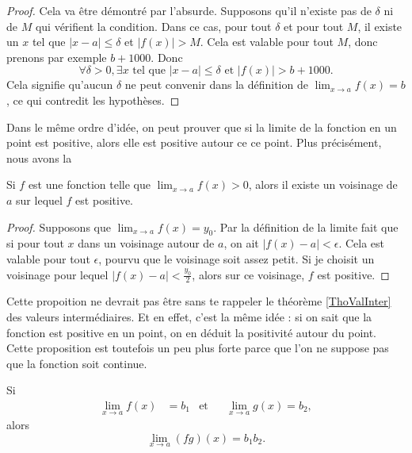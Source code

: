 \begin{proof}
	Cela va être démontré par l'absurde. Supposons qu'il n'existe pas de $\delta$ ni de $M$ qui vérifient la condition. Dans ce cas, pour tout $\delta$ et pour tout $M$, il existe un $x$ tel que $| x-a |\leq\delta$ et $| f(x) |> M$. Cela est valable pour tout $M$, donc prenons par exemple $b+1000$. Donc 
	\begin{equation}
	\forall\delta>0,\exists x\text{ tel que } | x-a |\leq\delta\text{ et }| f(x) |>b+1000.
	\end{equation}
	Cela signifie qu'aucun $\delta$ ne peut convenir dans la définition de $\lim_{x\to a}f(x)=b$, ce qui contredit les hypothèses.
\end{proof}

Dans le même ordre d'idée, on peut prouver que si la limite de la fonction en un point est positive, alors elle est positive autour ce ce point. Plus précisément, nous avons la
\begin{proposition}	\label{PropoLimPosFPos}
	Si $f$ est une fonction telle que $\lim_{x\to a}f(x)>0$, alors il existe un voisinage de $a$ sur lequel $f$ est positive.
\end{proposition}	

\begin{proof}
	Supposons que $\lim_{x\to a}f(x)=y_0$. Par la définition de la limite fait que si pour tout $x$ dans un voisinage autour de $a$, on ait $| f(x)-a |<\epsilon$. Cela est valable pour tout $\epsilon$, pourvu que le voisinage soit assez petit. Si je choisit un voisinage pour lequel $| f(x)-a |<\frac{ y_0 }{ 2 }$, alors sur ce voisinage, $f$ est positive.
\end{proof}

Cette propoition ne devrait pas être sans te rappeler le théorème \ref{ThoValInter} des valeurs intermédiaires. Et en effet, c'est la même idée : si on sait que la fonction est positive en un point, on en déduit la positivité autour du point. Cette proposition est toutefois un peu plus forte parce que l'on ne suppose pas que la fonction soit continue.

\begin{theorem}		\label{Tholimfgabab}
	Si
	\begin{align}
		\lim_{x\to a}f(x)&=b_1&\text{et}&&\lim_{x\to a}g(x)=b_2,
	\end{align}
	alors
	\begin{equation}
		\lim_{x\to a}(fg)(x)=b_1b_2.
	\end{equation}
\end{theorem}

